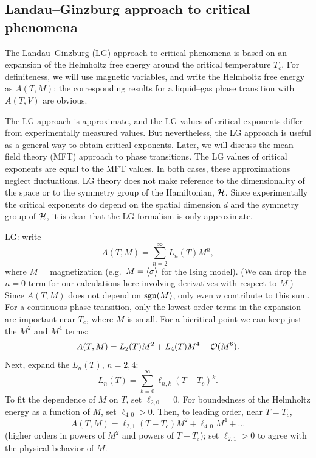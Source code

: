 \subsection{Landau--Ginzburg approach to critical phenomena}

The Landau--Ginzburg (LG) approach to critical phenomena is based on an expansion of the
Helmholtz free energy around the critical temperature $T_c$. For definiteness, we will use
magnetic variables, and write the Helmholtz free energy as $A(T,M)$; the corresponding results for
a liquid--gas phase transition with $A(T,V)$ are obvious.

The LG approach is approximate, and the LG values of critical exponents differ from
experimentally measured values. But nevertheless, the LG approach is useful as a general way to
obtain critical exponents. Later, we will discuss the mean field theory (MFT) approach to phase
transitions. The LG values of critical exponents are equal to the MFT values. In both cases, these
approximations neglect fluctuations. LG theory does not make reference to the dimensionality of the
space or to the symmetry group of the Hamiltonian, $\mathcal{H}$. Since experimentally the critical
exponents do depend on the spatial dimension $d$ and the symmetry group of $\mathcal{H}$, it is clear that
the LG formalism is only approximate.

LG: write
\begin{equation}
  A(T,M) = \sum_{n=2}^\infty L_n(T)M^n,
\end{equation}
where $M$ = magnetization (e.g.\ $M = \langle \sigma\rangle$ for the Ising model). (We can drop the $n = 0$
term for our calculations here involving derivatives with respect to $M$.) Since $A(T,M)$ does not
depend on $\operatorname{sgn}(M)$, only even $n$ contribute to this sum. For a continuous phase transition, only
the lowest-order terms in the expansion are important near $T_c$, where $M$ is small. For a
bicritical point we can keep just the $M^2$ and $M^4$ terms:
\begin{equation}
  A(T,M) = L_2(T)M^2 + L_4(T)M^4 + \mathcal{O}(M^6).
\end{equation}
Next, expand the $L_n(T)$, $n = 2,4$:
\begin{equation}
  L_n(T) = \sum_{k=0}^\infty\ell_{n,k}(T-T_c)^k .
\end{equation}
To fit the dependence of $M$ on $T$, set $\ell_{2,0} = 0$. For boundedness of the Helmholtz energy
as a function of $M$, set $\ell_{4,0}>0$. Then, to leading order, near $T = T_c$,
\begin{equation}
  A(T,M) = \ell_{2,1}(T-T_c)M^2 + \ell_{4,0}M^4 + \ldots
\end{equation}
(higher orders in powers of $M^2$ and powers of $T-T_c$); set $\ell_{2,1}>0$ to agree with the
physical behavior of $M$.

